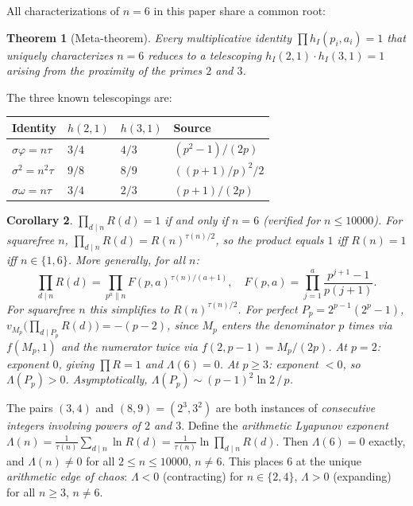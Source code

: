\documentclass[11pt]{amsart}
\newtheorem{theorem}{Theorem}
\newtheorem{corollary}[theorem]{Corollary}
\theoremstyle{remark}
\begin{document}
All characterizations of $n=6$ in this paper share a common root:

\begin{theorem}[Meta-theorem]\label{thm:meta}
Every multiplicative identity $\prod h_I(p_i,a_i)=1$
that uniquely characterizes $n=6$ reduces to a telescoping
$h_I(2,1) \cdot h_I(3,1) = 1$
arising from the proximity of the primes $2$ and $3$.
\end{theorem}

The three known telescopings are:
\begin{center}
\begin{tabular}{llll}
\hline
Identity & $h(2,1)$ & $h(3,1)$ & Source \\
\hline
$\sigma\varphi = n\tau$ & $3/4$ & $4/3$ & $(p^2\!-\!1)/(2p)$ \\
$\sigma^2 = n^2\tau$ & $9/8$ & $8/9$ & $((p\!+\!1)/p)^2/2$ \\
$\sigma\omega = n\tau$ & $3/4$ & $2/3$ & $(p\!+\!1)/(2p)$ \\
\hline
\end{tabular}
\end{center}

\begin{corollary}
$\prod_{d \mid n} R(d) = 1$ if and only if $n = 6$ (verified for $n \leq 10000$).
For squarefree $n$, $\prod_{d \mid n} R(d) = R(n)^{\tau(n)/2}$,
so the product equals $1$ iff $R(n) = 1$ iff $n \in \{1, 6\}$.
More generally, for all $n$:
\[
  \prod_{d \mid n} R(d) = \prod_{p^a \| n} F(p,a)^{\tau(n)/(a+1)},
  \quad F(p,a) = \prod_{j=1}^{a} \frac{p^{j+1}-1}{p(j+1)}.
\]
For squarefree $n$ this simplifies to $R(n)^{\tau(n)/2}$.
For perfect $P_p = 2^{p-1}(2^p-1)$,
$v_{M_p}\!\bigl(\prod_{d \mid P_p} R(d)\bigr) = -(p-2)$,
since $M_p$ enters the denominator $p$ times via $f(M_p,1)$
and the numerator twice via $f(2,p\!-\!1) = M_p/(2p)$.
At $p=2$: exponent $0$, giving $\prod R = 1$ and $\Lambda(6) = 0$.
At $p \geq 3$: exponent $< 0$, so $\Lambda(P_p) > 0$.
Asymptotically, $\Lambda(P_p) \sim (p\!-\!1)^2 \ln 2\, /\, p$.
\end{corollary}

The pairs $(3,4)$ and $(8,9) = (2^3, 3^2)$ are both instances of
\emph{consecutive integers involving powers of $2$ and $3$}.
Define the \emph{arithmetic Lyapunov exponent}
$\Lambda(n) = \frac{1}{\tau(n)} \sum_{d \mid n} \ln R(d)
= \frac{1}{\tau(n)} \ln \prod_{d \mid n} R(d)$.
Then $\Lambda(6) = 0$ exactly, and $\Lambda(n) \neq 0$ for all
$2 \leq n \leq 10000$, $n \neq 6$.
This places $6$ at the unique \emph{arithmetic edge of chaos}:
$\Lambda < 0$ (contracting) for $n \in \{2, 4\}$,
$\Lambda > 0$ (expanding) for all $n \geq 3$, $n \neq 6$.
\end{document}
